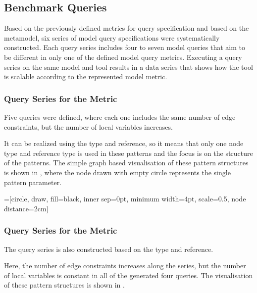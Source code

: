 

\subsection{Benchmark Queries}
\label{sec:benchmark-queries}

Based on the previously defined metrics for query specification and based on the
metamodel, six series of model query specifications were systematically
constructed. Each query series includes four to seven model queries that aim to
be different in only one of the defined model query metrics. Executing a query
series on the same model and tool results in a data series that shows how the
tool is scalable according to the represented model metric.

\subsubsection{ Query Series for the  Metric}
Five queries were defined, where each one includes the same number of edge
constraints, but the number of local variables increases. 

It can be realized using the  type and 
reference, so it means that only one node type and reference type is used in
these patterns and the focus is on the structure of the patterns. The simple
graph based visualisation of these pattern structures is shown in ,
where the node drawn with empty circle represents the
single pattern parameter.

=[circle, draw, fill=black, inner sep=0pt, minimum
							width=4pt, scale=0.5, node distance=2cm]


\subsubsection{ Query Series for the 
Metric}
The  query series is
also constructed based on the  type and 
reference. 

Here, the number of edge constraints increases along the series, but
the number of local variables is constant in all of the generated four queries.
The visualisation of these pattern structures is shown in . 




